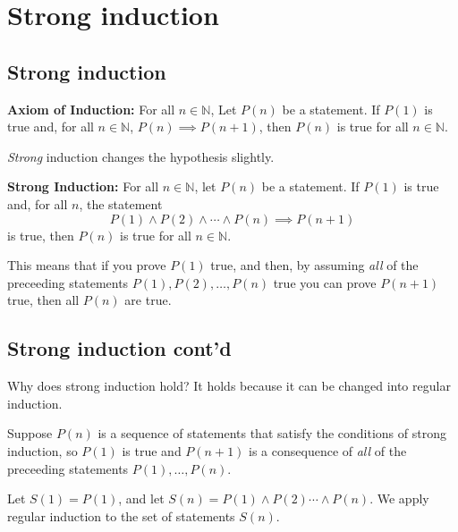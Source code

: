 \documentclass[
]{article}
\author{}
\date{}
\begin{document}
\hypertarget{strong-induction}{%
\section{Strong induction}\label{strong-induction}}

\hypertarget{strong-induction-1}{%
\subsection{Strong induction}\label{strong-induction-1}}

\textbf{Axiom of Induction:} For all \(n\in \mathbb{N}\), Let \(P(n)\)
be a statement. If \(P(1)\) is true and, for all \(n\in\mathbb{N}\),
\(P(n)\implies P(n+1)\), then \(P(n)\) is true for all
\(n\in\mathbb{N}\).

\emph{Strong} induction changes the hypothesis slightly.

\textbf{Strong Induction:} For all \(n\in\mathbb{N}\), let \(P(n)\) be a
statement. If \(P(1)\) is true and, for all \(n\), the statement \[
P(1)\wedge P(2)\wedge\cdots\wedge P(n)\implies P(n+1)
\] is true, then \(P(n)\) is true for all \(n\in\mathbb{N}\).

This means that if you prove \(P(1)\) true, and then, by assuming
\emph{all} of the preceeding statements \(P(1),P(2),\ldots, P(n)\) true
you can prove \(P(n+1)\) true, then all \(P(n)\) are true.

\vfill\eject

\hypertarget{strong-induction-contd}{%
\subsection{Strong induction cont'd}\label{strong-induction-contd}}

Why does strong induction hold? It holds because it can be changed into
regular induction.

Suppose \(P(n)\) is a sequence of statements that satisfy the conditions
of strong induction, so \(P(1)\) is true and \(P(n+1)\) is a consequence
of \emph{all} of the preceeding statements \(P(1),\ldots,P(n)\).

Let \(S(1)=P(1)\), and let \(S(n)=P(1)\wedge P(2)\cdots\wedge P(n)\). We
apply regular induction to the set of statements \(S(n)\).
\end{document}
